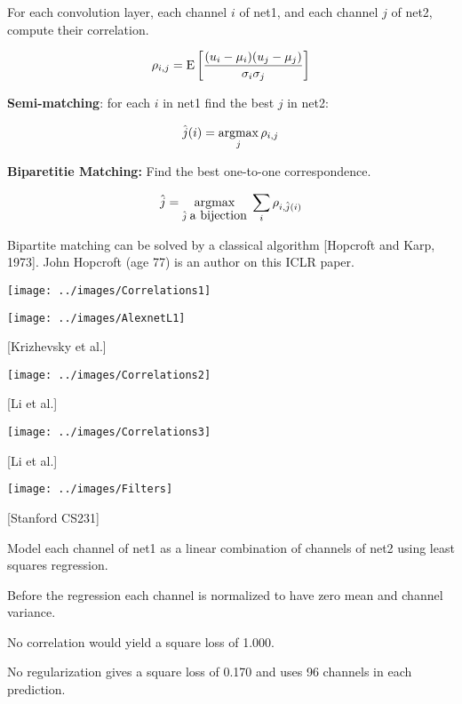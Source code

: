 {\vfill
For each convolution layer, each channel $i$ of net1, and each channel $j$ of net2, compute their correlation.

\vfill
$$\rho_{i,j} = \mathrm{E}\left[\frac{(u_i - \mu_i)(u_j- \mu_j)}{\sigma_i \sigma_j}\right]$$


{\bf Semi-matching}: for each $i$ in net1 find the best $j$ in net2:

$$\hat{j}(i) = \operatorname*{argmax}_j \rho_{i,j}$$

\vfill
{\bf Biparetitie Matching:} Find the best one-to-one correspondence.

$$\hat{j} = \operatorname*{argmax}_{\hat{j}\;\mbox{a bijection}}\;\sum_i \rho_{i,\hat{j}(i)}$$

\vfill
Bipartite matching can be solved by a classical algorithm [Hopcroft and Karp, 1973].  John Hopcroft (age 77) is an author on this ICLR paper.


\centerline{\texttt{[image: ../images/Correlations1]}}



\centerline{\texttt{[image: ../images/AlexnetL1]}}
\centerline{[Krizhevsky et al.]}


\centerline{\texttt{[image: ../images/Correlations2]}}
\centerline{[Li et al.]}


\centerline{\texttt{[image: ../images/Correlations3]}}
\centerline{[Li et al.]}


\centerline{\texttt{[image: ../images/Filters]}}
\centerline{[Stanford CS231]}


Model each channel of net1 as a linear combination of channels of net2 using least squares regression.

\vfill
Before the regression each channel is normalized to have zero mean and channel variance.

\vfill
No correlation would yield a {\color{red} square loss of 1.000}.

\vfill
No regularization gives a {\color{red} square loss of 0.170} and uses {\color{red} 96 channels} in each prediction.

}
